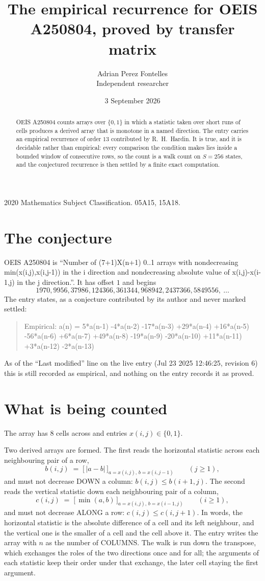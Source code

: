 \documentclass[11pt,a4paper]{article}
\title{The empirical recurrence for OEIS A250804, proved by transfer matrix}
\author{Adrian Perez Fontelles\\ \small Independent researcher}
\date{3 September 2026}
\theoremstyle{plain}
\theoremstyle{definition}
\begin{document}
\maketitle

\begin{abstract}
OEIS A250804 counts arrays over $\{0,1\}$ in which a statistic taken over short runs
of cells produces a derived array that is monotone in a named direction. The entry carries an
empirical recurrence of order $13$ contributed by R.~H.~Hardin. It is true, and it is
decidable rather than empirical: every comparison the condition makes lies inside a bounded
window of consecutive rows, so the count is a walk count on $S=256$ states, and the
conjectured recurrence is then settled by a finite exact computation.
\end{abstract}

\noindent\small 2020 Mathematics Subject Classification. 05A15, 15A18.\normalsize

\section{The conjecture}

OEIS A250804 is ``Number of (7+1)X(n+1) 0..1 arrays with nondecreasing min(x(i,j),x(i,j-1)) in the i direction and nondecreasing absolute value of x(i,j)-x(i-1,j) in the j direction.''. It has offset $1$ and begins
\[
1970, 9956, 37986, 124366, 361344, 968942, 2437366, 5849556,\ \dots
\]
The entry states, as a conjecture contributed by its author and never marked settled:
\begin{quote}
Empirical: a(n) = 5*a(n-1) -4*a(n-2) -17*a(n-3) +29*a(n-4) +16*a(n-5) -56*a(n-6) +6*a(n-7) +49*a(n-8) -19*a(n-9) -20*a(n-10) +11*a(n-11) +3*a(n-12) -2*a(n-13)
\end{quote}
As of the ``Last modified'' line on the live entry (Jul 23 2025 12:46:25, revision 6) this is still
recorded as empirical, and nothing on the entry records it as proved.

\section{What is being counted}

The array has $8$ cells across and entries $x(i,j)\in\{0,1\}$.

Two derived arrays are formed. The first reads the horizontal statistic across each
neighbouring pair of a row,
\[
b(i,j)\;=\;\bigl[\,\lvert a-b\rvert\,\bigr]_{a=x(i,j),\,b=x(i,j-1)}\qquad (j\ge1),
\]
and must not decrease DOWN a column: $b(i,j)\le b(i{+}1,j)$. The second reads the vertical
statistic down each neighbouring pair of a column,
\[
c(i,j)\;=\;\bigl[\,\min(a,b)\,\bigr]_{a=x(i,j),\,b=x(i{-}1,j)}\qquad (i\ge1),
\]
and must not decrease ALONG a row: $c(i,j)\le c(i,j{+}1)$. In words, the horizontal statistic
is the absolute difference of a cell and its left neighbour, and the vertical one is
the smaller of a cell and the cell above it. The entry writes the array with $n$ as the number of COLUMNS. The walk is run down the transpose, which exchanges the roles of the two directions once and for all; the arguments of each statistic keep their order under that exchange, the later cell staying the first argument.
\end{document}

